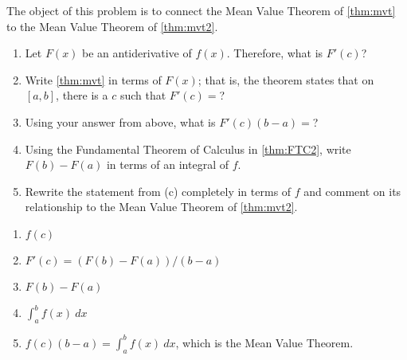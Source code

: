 {The object of this problem is to connect the Mean Value Theorem of \autoref{thm:mvt} to the Mean Value Theorem of \autoref{thm:mvt2}.
\begin{enumerate}
\item		Let $F(x)$ be an antiderivative of $f(x)$. Therefore, what is $F'(c)$?
\item		Write \autoref{thm:mvt} in terms of $F(x)$; that is, the theorem states that on $[a,b]$, there is a $c$ such that $F'(c) = $?
\item		Using your answer from above, what is $F'(c)(b-a)=$?
\item		Using the Fundamental Theorem of Calculus in \autoref{thm:FTC2}, write $F(b) -F(a)$ in terms of an integral of $f$.
\item		Rewrite the statement from (c) completely in terms of $f$ and comment on its relationship to the Mean Value Theorem of \autoref{thm:mvt2}.
\end{enumerate}
}
{\begin{enumerate}
\item		$f(c)$
\item		$F'(c) = (F(b)-F(a))/(b-a)$
\item		$F(b) - F(a)$
\item		$\int_a^b f(x) \ dx$
\item		$f(c)(b-a) = \int_a^b f(x)\ dx$, which is the Mean Value Theorem.
\end{enumerate}
}

